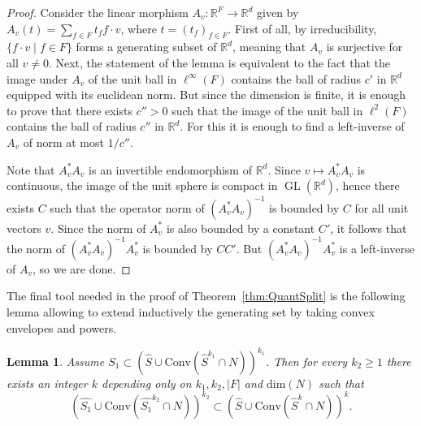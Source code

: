 \documentclass[11pt,leqno]{article}
\theoremstyle{plain}
\newtheorem{lemma}[theorem]{Lemma}
\theoremstyle{definition}
\theoremstyle{remark}
\numberwithin{equation}{section}
\newcommand{\R}{\mathbb{R}}
\DeclareMathOperator{\GL}{GL}
\begin{document}
\begin{proof}
Consider the linear morphism $A_v:\R^{F}\to \R^d$ given by $A_v(t)=\sum_{f\in F} t_f f\cdot v$, where $t=(t_f)_{f\in F}$. First of all, by irreducibility, $\{f\cdot v\mid f\in F\}$ forms a generating subset of $\R^d$, meaning that $A_v$ is surjective for all $v\neq 0$. Next, the statement of the lemma is equivalent to the fact that the image under $A_v$ of the unit ball in $\ell^{\infty}(F)$ contains the ball of radius $c'$ in $\R^d$ equipped with its euclidean norm. But since the dimension is finite, it is enough to prove that there exists $c''>0$ such that the image of the unit ball in $\ell^{2}(F)$ contains the ball of radius $c''$ in $\R^d$. For this it is enough to find a left-inverse of $A_v$ of norm at most $1/c''$.

Note that $A_v^*A_v$ is an invertible endomorphism of $\R^d$. Since $v\mapsto A_v^*A_v$ is continuous, the image of the unit sphere is compact in $\GL(\R^d)$, hence there exists $C$ such that the operator norm of $(A_v^*A_v)^{-1}$ is bounded by $C$ for all unit vectors $v$. Since the norm of $A_v^*$ is also bounded by a constant $C'$, it follows that the norm of $(A_v^*A_v)^{-1}A_v^*$ is bounded by $CC'$. 
But $(A_v^*A_v)^{-1}A_v^*$ is a left-inverse of $A_v$, so we are done.
\end{proof}

The final tool needed in the proof of Theorem~\ref{thm:QuantSplit} is the following lemma allowing to extend inductively the generating set by taking convex envelopes and powers.

\begin{lemma}\label{lem:S1S2}
Assume $S_1 \subset \left( \widehat{S}\cup \mathrm{Conv}(\widehat{S}^{k_1}\cap N)\right)^{k_1}$. Then for every $k_2\ge 1$ there exists an integer $k$ depending only on $k_1,k_2, |F|$ and $\mathrm{dim}(N)$ such that
\[
\left( \widehat{S_1}\cup \mathrm{Conv}(\widehat{S_1}^{k_2}\cap N)\right)^{k_2} \subset \left( \widehat{S}\cup \mathrm{Conv}(\widehat{S}^{k}\cap N)\right)^{k}.
\]
\end{lemma}
\end{document}
